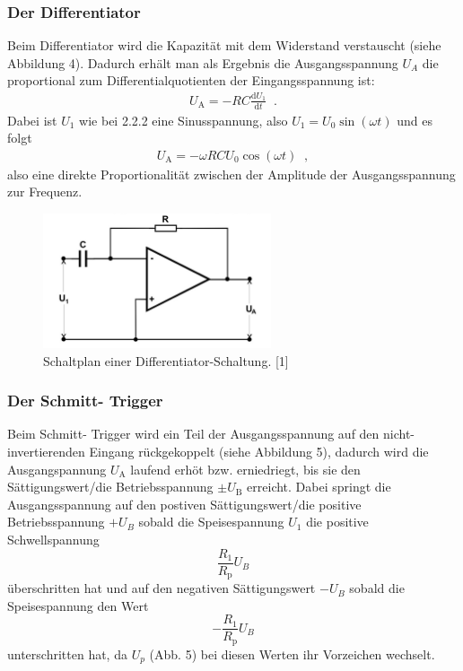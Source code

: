 \documentclass{scrartcl}
\begin{document}
\subsubsection{Der Differentiator}
Beim Differentiator wird die Kapazität mit dem Widerstand verstauscht (siehe Abbildung 4). Dadurch erhält man als Ergebnis die Ausgangsspannung $U_A$ die proportional zum Differentialquotienten der Eingangsspannung ist:
\begin{align*}
U_\mathrm{A} = - RC \frac{\mathrm{d}U_1}{\mathrm{d}t} \;\;.
\end{align*}
Dabei ist $U_1$ wie bei 2.2.2 eine Sinusspannung, also $U_1 = U_0 \sin (\omega t)$ und es folgt
\begin{align}
U_\mathrm{A} = - \omega RC U_0 \cos (\omega t)\;\;,
\label{timbugtu}
\end{align}
also eine direkte Proportionalität zwischen der Amplitude der Ausgangsspannung zur Frequenz.
\begin{figure}[!h]
\centering
\includegraphics[width=0.6\textwidth]{differentiator}
\caption{Schaltplan einer Differentiator-Schaltung. [1]}
\label{differentiator}
\end{figure}

\subsubsection{Der Schmitt- Trigger}
Beim Schmitt- Trigger wird ein Teil der Ausgangsspannung auf den nicht-invertierenden Eingang rückgekoppelt (siehe Abbildung 5), dadurch wird die Ausgangspannung $U_\text{A}$ laufend erhöt bzw. erniedriegt, bis sie den Sättigungswert/die Betriebsspannung $\pm U_\text{B}$ erreicht.
Dabei springt die Ausgangsspannung auf den postiven Sättigungswert/die positive Betriebsspannung $+U_B$ sobald die Speisespannung $U_1$ die positive Schwellspannung
\begin{equation}
  \frac{R_1}{R_\text{p}}U_B
\end{equation}
überschritten hat und auf den negativen Sättigungswert $-U_B$ sobald die Speisespannung den Wert
\begin{equation}
  -\frac{R_1}{R_\text{p}}U_B
\end{equation}
unterschritten hat, da $U_p$ (Abb. 5) bei diesen Werten ihr Vorzeichen wechselt.
\end{document}
